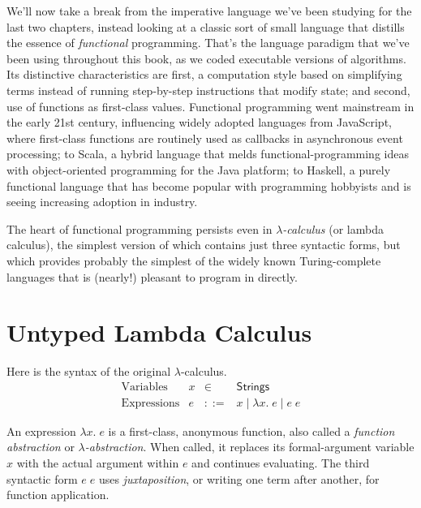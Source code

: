 \documentclass{amsbook}
\theoremstyle{definition}
\theoremstyle{remark}
\numberwithin{section}{chapter}
\numberwithin{equation}{chapter}
\begin{document}
We'll now take a break from the imperative language we've been studying for the last two chapters, instead looking at a classic sort of small language that distills the essence of \emph{functional} programming.
That's the language paradigm that we've been using throughout this book, as we coded executable versions of algorithms.
Its distinctive characteristics are first, a computation style based on simplifying terms instead of running step-by-step instructions that modify state; and second, use of functions as first-class values.
Functional programming went mainstream in the early 21st century, influencing widely adopted languages from JavaScript, where first-class functions are routinely used as callbacks in asynchronous event processing; to Scala, a hybrid language that melds functional-programming ideas with object-oriented programming for the Java platform; to Haskell, a purely functional language that has become popular with programming hobbyists and is seeing increasing adoption in industry.

The heart of functional programming persists even in \emph{$\lambda$-calculus} (or lambda calculus), the simplest version of which contains just three syntactic forms, but which provides probably the simplest of the widely known Turing-complete languages that is (nearly!) pleasant to program in directly.


\section{Untyped Lambda Calculus}

Here is the syntax of the original $\lambda$-calculus.
$$\begin{array}{rrcl}
  \textrm{Variables} & x &\in& \mathsf{Strings} \\
  \textrm{Expressions} & e &::=& x \mid \lambda x. \; e \mid e \; e
\end{array}$$

An expression $\lambda x. \; e$ is a first-class, anonymous function, also called a \emph{function abstraction} or \emph{$\lambda$-abstraction}.
When called, it replaces its formal-argument variable $x$ with the actual argument within $e$ and continues evaluating.
The third syntactic form $e \; e$ uses \emph{juxtaposition}, or writing one term after another, for function application.
\end{document}
